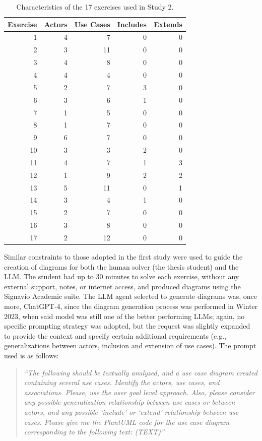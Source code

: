 \begin{table}[ht]
\centering
\caption{Characteristics of the 17 exercises used in Study 2.}
\label{tab:ex_summary_llm4mod2}
\small
\begin{tabular}{rrrrr}
\toprule
Exercise & Actors & Use Cases & Includes & Extends \\
\midrule
1  & 4 & 7  & 0 & 0 \\
2  & 3 & 11 & 0 & 0 \\
3  & 4 & 8  & 0 & 0 \\
4  & 4 & 4  & 0 & 0 \\
5  & 2 & 7  & 3 & 0 \\
6  & 3 & 6  & 1 & 0 \\
7  & 1 & 5  & 0 & 0 \\
8  & 1 & 7  & 0 & 0 \\
9  & 6 & 7  & 0 & 0 \\
10 & 3 & 3  & 2 & 0 \\
11 & 4 & 7  & 1 & 3 \\
12 & 1 & 9  & 2 & 2 \\
13 & 5 & 11 & 0 & 1 \\
14 & 3 & 4  & 1 & 0 \\
15 & 2 & 7  & 0 & 0 \\
16 & 3 & 8  & 0 & 0 \\
17 & 2 & 12 & 0 & 0 \\
\bottomrule
\end{tabular}
\end{table}

Similar constraints to those adopted in the first study were used to guide the creation of diagrams for both the human solver (the thesis student) and the LLM. The student had up to 30 minutes to solve each exercise, without any external support, notes, or internet access, and produced diagrams using the Signavio Academic suite. The LLM agent selected to generate diagrams was, once more, ChatGPT-4, since the diagram generation process was performed in Winter 2023, when said model was still one of the better performing LLMs; again, no specific prompting strategy was adopted, but the request was slightly expanded to provide the context and specify certain additional requirements (e.g., generalizations between actors, inclusion and extension of use cases). The prompt used is as follows:

\begin{quote}
\textit{``The following should be textually analyzed, and a use case diagram created containing several use cases. Identify the actors, use cases, and associations. Please, use the user goal level approach. Also, please consider any possible generalization relationship between use cases or between actors, and any possible `include' or `extend' relationship between use cases. Please give me the PlantUML code for the use case diagram corresponding to the following text: (TEXT)''}
\end{quote}

